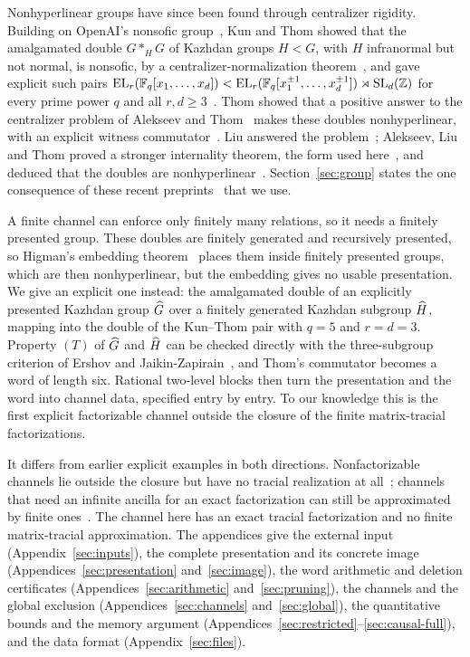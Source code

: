 \documentclass[11pt]{article}
\begin{document}
Nonhyperlinear groups have since been found through centralizer rigidity. Building on
OpenAI's nonsofic group~\cite{openai}, Kun and Thom showed that the amalgamated double $G*_HG$
of Kazhdan groups $H<G$, with $H$ infranormal but not normal, is nonsofic, by a
centralizer-normalization theorem~\cite[Theorems~A and~4.1]{kt}, and gave explicit such pairs
$\mathrm{EL}_r(\mathbb F_q[x_1,\ldots,x_d])<\mathrm{EL}_r(\mathbb F_q[x_1^{\pm1},\ldots,x_d^{\pm1}])\rtimes\operatorname{SL}_d(\mathbb Z)$
for every prime power $q$ and all $r,d\ge3$~\cite[Theorem~E]{kt}. Thom showed that a positive
answer to the centralizer problem of Alekseev and Thom~\cite[Open Problem~6.2(a)]{at} makes
these doubles nonhyperlinear, with an explicit witness commutator~\cite[Theorems~1.2 and~1.3,
Section~5.2]{thom}. Liu answered the problem~\cite[Theorem~1.2]{liu}; Alekseev, Liu and Thom
proved a stronger internality theorem, the form used here~\cite[Theorem~B]{alt}, and deduced
that the doubles are nonhyperlinear~\cite[Corollary~C]{alt}. Section~\ref{sec:group} states
the one consequence of these recent preprints~\cite{thom,alt} that we use.

A finite channel can enforce only finitely many relations, so it needs a finitely presented
group. These doubles are finitely generated and recursively presented, so Higman's embedding
theorem~\cite{higman} places them inside finitely presented groups, which are then
nonhyperlinear, but the embedding gives no usable presentation. We give an explicit one
instead: the amalgamated double of an explicitly presented Kazhdan group $\widehat G$ over a
finitely generated Kazhdan subgroup $\widehat H$, mapping into the double of the Kun--Thom pair with
$q=5$ and $r=d=3$. Property $(T)$ of $\widehat G$ and $\widehat H$ can be checked directly with the
three-subgroup criterion of Ershov and Jaikin-Zapirain~\cite{ejz}, and Thom's commutator
becomes a word of length six. Rational two-level blocks then turn the
presentation and the word into channel data, specified entry by entry. To our knowledge this
is the first explicit factorizable channel outside the closure of the finite matrix-tracial
factorizations.

It differs from earlier explicit examples in both directions. Nonfactorizable channels lie
outside the closure but have no tracial realization at all~\cite{hm11}; channels that need an
infinite ancilla for an exact factorization can still be approximated by finite
ones~\cite{mr,mori}. The channel here has an exact tracial factorization and no finite
matrix-tracial approximation. The appendices give the external input
(Appendix~\ref{sec:inputs}), the complete presentation and its concrete image
(Appendices~\ref{sec:presentation} and~\ref{sec:image}), the word arithmetic and deletion
certificates (Appendices~\ref{sec:arithmetic} and~\ref{sec:pruning}), the channels and the
global exclusion (Appendices~\ref{sec:channels} and~\ref{sec:global}), the quantitative bounds
and the memory argument (Appendices~\ref{sec:restricted}--\ref{sec:causal-full}), and the data
format (Appendix~\ref{sec:files}).
\end{document}
